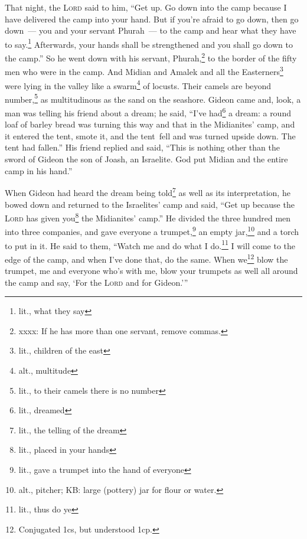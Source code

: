 \begin{inparaenum}
     That night, the \textsc{Lord} said to him, ``Get up. Go down into the camp because I have delivered the camp into your hand.%
     But if you're afraid to go down, then go down~--- you and your servant Phurah~--- to the camp%
     and hear what they have to say.\footnote{lit., what they say} Afterwards, your hands shall be strengthened and you shall go down to the camp.'' So he went down with his servant, Phurah,\footnote{xxxx: If he has more than one servant, remove commas.} to the border of the fifty men who were in the camp.%
     And Midian and Amalek and all the Easterners\footnote{lit., children of the east} were lying in the valley like a swarm\footnote{alt., multitude} of locusts. Their camels are beyond number,\footnote{lit., to their camels there is no number} as multitudinous as the sand on the seashore.%
     Gideon came and, look, a man was telling his friend about a dream; he said, ``I've had\footnote{lit., dreamed} a dream: a round loaf of barley bread was turning this way and that in the Midianites' camp, and it entered the tent, smote it, and the tent\understood\ fell and was turned upside down. The tent had fallen.''%
     His friend replied and said, ``This is nothing other than the sword of Gideon the son of Joash, an Israelite. God put Midian and the entire camp in his hand.''%
    
     When Gideon had heard the dream being told\footnote{lit., the telling of the dream} as well as its interpretation, he bowed down and returned to the Israelites' camp and said, ``Get up because the \textsc{Lord} has given you\footnote{lit., placed in your hands} the Midianites' camp.''%
     He divided the three hundred men into three companies, and gave everyone a trumpet,\footnote{lit., gave a trumpet into the hand of everyone} an empty jar,\footnote{alt., pitcher; KB: large (pottery) jar for flour or water.} and a torch to put in it.%
     He said to them, ``Watch me and do what I do.\footnote{lit., thus do ye} I will come to the edge of the camp, and when I've done that, do the same.%
     When we\footnote{Conjugated 1cs, but understood 1cp.} blow the trumpet, me and everyone who's with me, blow your trumpets as well all around the camp and say, `For the \textsc{Lord} and for Gideon.'\thinspace''%
    

\end{inparaenum}
